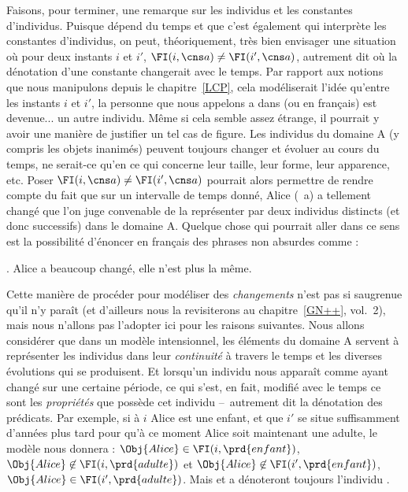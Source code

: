 Faisons, pour terminer, une remarque sur les individus et les constantes d'individus. Puisque {\FI} dépend du temps et que c'est également {\FI} qui interprète les constantes d'individus, on peut, théoriquement, très bien envisager une situation où pour deux instants $i$ et $i'$,  \(\FI(i,\cns a)\neq\FI(i',\cns a)\), autrement dit où la dénotation d'une constante changerait avec le temps. 
Par rapport aux notions que nous manipulons depuis le chapitre~\ref{LCP}, cela modéliserait l'idée qu'entre les instants $i$ et $i'$, la personne que nous appelons \cns a dans {\LO} (ou  en français) est devenue... un autre individu. Même si cela semble assez étrange, il pourrait y avoir une manière de justifier un tel cas de figure. Les individus du domaine \Unv A (y compris les objets inanimés) peuvent toujours changer et évoluer au cours du temps, ne serait-ce qu'en ce qui concerne leur taille, leur forme, leur apparence, etc. Poser \(\FI(i,\cns a)\neq\FI(i',\cns a)\) pourrait alors permettre de rendre compte du fait que sur un intervalle de temps donné, Alice (\ie\ \cns a) a tellement changé que l'on juge convenable de la représenter par deux individus distincts (et donc successifs) dans le domaine \Unv A.  Quelque chose qui pourrait aller dans ce sens est la possibilité d'énoncer en français des phrases non absurdes comme :

\ex. Alice a beaucoup changé, elle n'est plus la même.


Cette manière de procéder pour modéliser des \emph{changements} n'est pas si 
saugrenue qu'il n'y paraît (et d'ailleurs nous la revisiterons au chapitre~\ref{GN++}, vol.~2), mais nous n'allons pas l'adopter ici pour les raisons suivantes. 
Nous allons considérer que dans un modèle intensionnel, les éléments du domaine \Unv A servent à représenter les individus dans leur \emph{continuité} à travers le temps et les diverses évolutions qui se produisent.  Et lorsqu'un individu nous apparaît comme ayant changé sur une certaine période, ce qui s'est,  en fait, modifié avec le temps ce sont les \emph{propriétés} que possède cet individu --~autrement dit la dénotation des prédicats. Par exemple, si à $i$ Alice est une enfant, et que $i'$ se situe suffisamment d'années plus tard pour qu'à ce moment Alice soit maintenant une adulte, le modèle nous donnera : 
\(\Obj{Alice}\in \FI(i,\prd{enfant})\),
\(\Obj{Alice}\not\in \FI(i,\prd{adulte})\)
et
\(\Obj{Alice}\not\in \FI(i',\prd{enfant})\),
\(\Obj{Alice}\in \FI(i',\prd{adulte})\).  
Mais  et \cns a dénoteront toujours l'individu .
 
